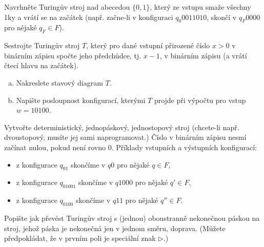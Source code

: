 \documentclass[a4paper,12pt]{amsart}
\begin{document}
\begin{problem}

    Navrhněte Turingův stroj nad abecedou $\{0,1\}$, který ze vstupu smaže všechny 1ky a vrátí se na začátek (např. začne-li v konfiguraci $q_0 0011010$, skončí v $q_F 0000$ pro nějaké $q_F\in F$).

\end{problem}


\begin{problem}[Předchůdce]

    Sestrojte Turingův stroj $T$, který pro dané vstupní přirozené číslo $x>0$ v binárním zápisu spočte jeho předchůdce, tj. $x-1$, v binárním zápisu (a vrátí čtecí hlavu na začátek). %
    
    \smallskip
    \begin{enumerate}[(a)]    
        \item Nakreslete stavový diagram $T$.
        \item Napište posloupnost konfigurací, kterými $T$ projde při výpočtu pro vstup $w=10100$.
    \end{enumerate}

    Vytvořte deterministický, jednopáskový, jednostopový stroj (chcete-li např. dvoustopový, musíte jej sami naprogramovat.) Číslo v binárním zápisu nesmí začínat nulou, pokud není rovno 0. Příklady vstupních a výstupních konfigurací: 
        
    \begin{itemize}    
        \item z konfigurace $q_01$ skončíme v $q0$ pro nějaké $q\in F$,
        \item z konfigurace $q_01001$ skončíme v $q1000$ pro nějaké $q'\in F$,
        \item z konfigurace $q_0100$ skončíme v $q11$ pro nějaké $q''\in F$.
    \end{itemize}
    
\end{problem}

\begin{problem}

    Popište jak převést Turingův stroj s (jednou) oboustranně nekonečnou páskou na stroj, jehož páska je nekonečná jen v jednom směru, doprava. (Můžete předpokládat, že v prvním poli je speciální znak $\triangleright$.)

\end{problem}
\end{document}
